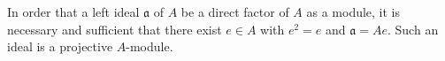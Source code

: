 In order that a left ideal $\mathfrak{a}$ of $A$ be a direct factor of $A$ as a module, it is necessary and sufficient that there exist $e \in A$ with $e^2 = e$ and $\mathfrak{a} = Ae$. Such an ideal is a projective $A$-module.
